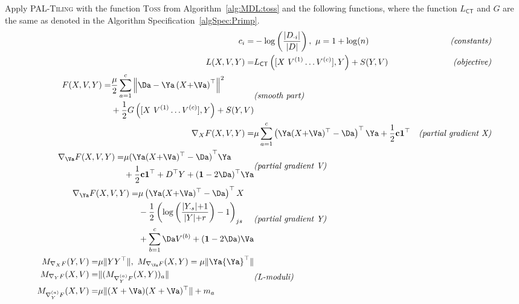 \begin{algSpec}[C-Salt]\label{algSpec:CSalt} Apply \textsc{PAL-Tiling} with the function \textsc{Toss} from Algorithm~\ref{alg:MDL:toss} and the following functions, where the function $L_{\mathsf{CT}}$ and $G$ are the same as denoted in the Algorithm Specification~\ref{algSpec:Primp}.
\begin{align*}
c_i =& -\log\left(\frac{|D_{\cdot i}|}{|D|}\right),\ \mu=1+\log(n) &\textit{(constants)}\\
L(X,V,Y)=& L_{\mathsf{CT}}\left([X\ V^{(1)}\ldots V^{(c)}],Y\right)+S(Y,V)&\textit{(objective)}\\
\begin{split}
F(X,V,Y)=& \frac{\mu}{2}\sum_{a=1}^c\left\|\Da-\Ya\left(X{+}\Va\right)^\top \right\|^2\\
&+\frac{1}{2} G\left([X\ V^{(1)}\ldots V^{(c)}],Y\right)
+S(Y,V)
\end{split}&\textit{(smooth part)}\\
\nabla_XF(X,V,Y)=&\mu\sum_{a=1}^c\left(\Ya(X{+}\Va)^\top -\Da\right)^\top \Ya+\frac{1}{2}\mathbf{c}\mathbf{1}^\top & \textit{(partial gradient X)}\\
\begin{split}
\nabla_\Va F(X,V,Y)=&\mu{(\Ya(X{+}\Va)^\top -\Da)}^\top\Ya\\
&+\frac{1}{2}\mathbf{c1}^\top+D^\top Y +(\mathbf{1}-2\Da)^\top \Ya
\end{split}&\textit{(partial gradient V)}\\
\begin{split}
\nabla_\Ya F(X,V,Y)=&\mu \left(\Ya(X{+}\Va)^\top-\Da\right)^\top X\\
&-\frac{1}{2}\left(\log\left(\frac{|Y_{\cdot s}|{+}1}{|Y|{+}r}\right)-1\right)_{js}\\
 &+ \sum_{b=1}^c\Da V^{(b)}+(\mathbf{1}-2\Da)\Va
  \end{split}& \textit{(partial gradient Y)}\\
  \begin{split}
      M_{\nabla_X F}(Y,V)=&\mu\|YY^\top \|,\ M_{\nabla_\Va F}(X,Y)=\mu\|\Ya{\Ya}^\top \|\\
      M_{\nabla_YF}(X,V)=&\|(M_{\nabla_Y^{(a)} F}(X,Y))_a\|\\ M_{\nabla_Y^{(a)} F}(X,V)=&\mu\|(X+\Va)(X+\Va)^\top \|+m_a
  \end{split} & \textit{(L-moduli)}
\end{align*}
\end{algSpec}
